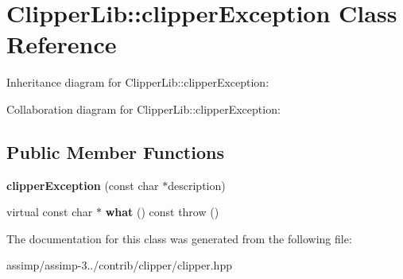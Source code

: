 \hypertarget{class_clipper_lib_1_1clipper_exception}{\section{Clipper\+Lib\+:\+:clipper\+Exception Class Reference}
\label{class_clipper_lib_1_1clipper_exception}
}


Inheritance diagram for Clipper\+Lib\+:\+:clipper\+Exception\+:


Collaboration diagram for Clipper\+Lib\+:\+:clipper\+Exception\+:
\subsection*{Public Member Functions}
\begin{DoxyCompactItemize}
\item 
\hypertarget{class_clipper_lib_1_1clipper_exception_a7d44b32d06cd870500355667f6e0d6ed}{{\bfseries clipper\+Exception} (const char $\ast$description)}\label{class_clipper_lib_1_1clipper_exception_a7d44b32d06cd870500355667f6e0d6ed}

\item 
\hypertarget{class_clipper_lib_1_1clipper_exception_a7bd8c881bda597f839670dde97fe04d4}{virtual const char $\ast$ {\bfseries what} () const   throw ()}\label{class_clipper_lib_1_1clipper_exception_a7bd8c881bda597f839670dde97fe04d4}

\end{DoxyCompactItemize}


The documentation for this class was generated from the following file\+:\begin{DoxyCompactItemize}
\item 
assimp/assimp-\/3../contrib/clipper/clipper.\+hpp\end{DoxyCompactItemize}
